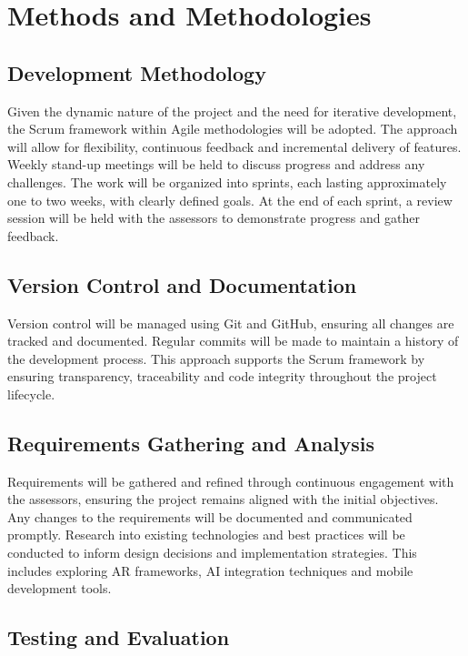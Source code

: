 \documentclass[10pt]{article}
\begin{document}
\section{Methods and Methodologies}
    \subsection{Development Methodology}
    Given the dynamic nature of the project and the need for iterative development, the Scrum framework within Agile methodologies will be adopted. The approach will allow for flexibility, continuous feedback
    and incremental delivery of features. Weekly stand-up meetings will be held to discuss progress and address any challenges. The work will be organized into sprints, each lasting approximately one to two weeks,
    with clearly defined goals. At the end of each sprint, a review session will be held with the assessors to demonstrate progress and gather feedback.
    
    \subsection{Version Control and Documentation}
    Version control will be managed using Git and GitHub, ensuring all changes are tracked and documented. Regular commits will be made to maintain a history of the development process. This
    approach supports the Scrum framework by ensuring transparency, traceability and code integrity throughout the project lifecycle.

    \subsection{Requirements Gathering and Analysis}
    Requirements will be gathered and refined through continuous engagement with the assessors, ensuring the project remains aligned with the initial objectives. Any changes to the requirements will be documented and communicated promptly.
    Research into existing technologies and best practices will be conducted to inform design decisions and implementation strategies. This includes exploring AR frameworks, AI integration techniques and mobile development tools.

    \subsection{Testing and Evaluation}
\end{document}
